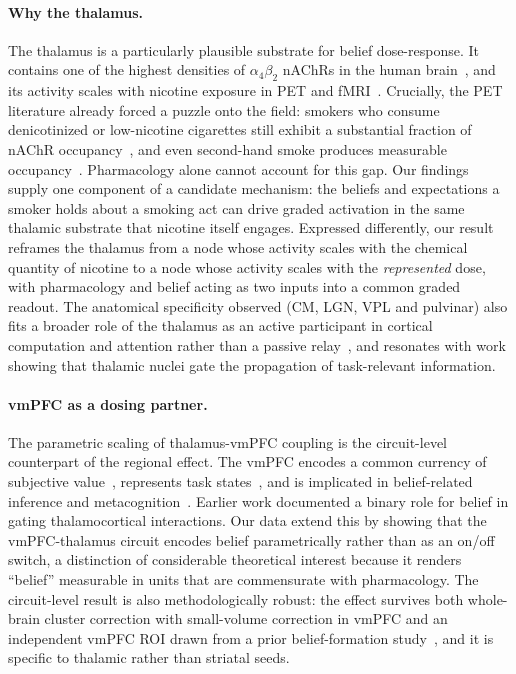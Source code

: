 \documentclass[11pt]{article}
\begin{document}
\paragraph{Why the thalamus.} The thalamus is a particularly plausible substrate for belief dose-response. It contains one of the highest densities of $\alpha_4\beta_2$ nAChRs in the human brain~\cite{picciotto2008nicotinic,cosgrove2009beta2}, and its activity scales with nicotine exposure in PET and fMRI~\cite{brody2006cigarette,brody2011ventral}. Crucially, the PET literature already forced a puzzle onto the field: smokers who consume denicotinized or low-nicotine cigarettes still exhibit a substantial fraction of nAChR occupancy~\cite{brody2011ventral,cosgrove2009beta2}, and even second-hand smoke produces measurable occupancy~\cite{cosgrove2009beta2}. Pharmacology alone cannot account for this gap. Our findings supply one component of a candidate mechanism: the beliefs and expectations a smoker holds about a smoking act can drive graded activation in the same thalamic substrate that nicotine itself engages. Expressed differently, our result reframes the thalamus from a node whose activity scales with the chemical quantity of nicotine to a node whose activity scales with the \textit{represented} dose, with pharmacology and belief acting as two inputs into a common graded readout. The anatomical specificity observed (CM, LGN, VPL and pulvinar) also fits a broader role of the thalamus as an active participant in cortical computation and attention rather than a passive relay~\cite{sherman2016thalamus,halassa2017thalamic}, and resonates with work showing that thalamic nuclei gate the propagation of task-relevant information.

\paragraph{vmPFC as a dosing partner.} The parametric scaling of thalamus-vmPFC coupling is the circuit-level counterpart of the regional effect. The vmPFC encodes a common currency of subjective value~\cite{plassmann2007orbitofrontal,levy2012root}, represents task states~\cite{wilson2014orbitofrontal,schuck2016human}, and is implicated in belief-related inference and metacognition~\cite{rouault2018belief,rouault2022prefrontal}. Earlier work documented a binary role for belief in gating thalamocortical interactions. Our data extend this by showing that the vmPFC-thalamus circuit encodes belief parametrically rather than as an on/off switch, a distinction of considerable theoretical interest because it renders ``belief'' measurable in units that are commensurate with pharmacology. The circuit-level result is also methodologically robust: the effect survives both whole-brain cluster correction with small-volume correction in vmPFC and an independent vmPFC ROI drawn from a prior belief-formation study~\cite{rouault2018belief}, and it is specific to thalamic rather than striatal seeds.
\end{document}
